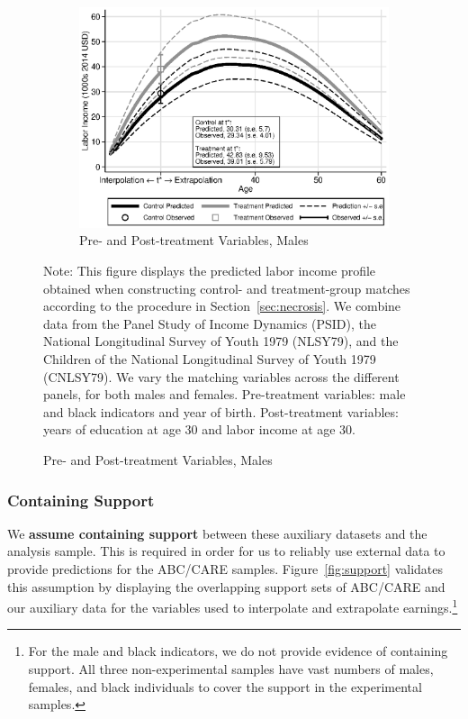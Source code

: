 \begin{figure}
\begin{subfigure}[h]{0.3\textwidth}
\end{subfigure}%
\begin{subfigure}[h]{0.3\textwidth}
	\centering
	\caption{Pre- and Post-treatment Variables, Males}
		\includegraphics[width=\textwidth]{output/labor_25-65_pset1_mset3_male.eps}
\end{subfigure}
\footnotesize \justify
Note: This figure displays the predicted labor income profile obtained when constructing control- and treatment-group matches according to the procedure in Section~\ref{sec:necrosis}. We combine data from the Panel Study of Income Dynamics (PSID), the National Longitudinal Survey of Youth 1979 (NLSY79), and the Children of the National Longitudinal Survey of Youth 1979 (CNLSY79). We vary the matching variables across the different panels, for both males and females. Pre-treatment variables: male and black indicators and year of birth. Post-treatment variables: years of education at age 30 and labor income at age 30.
\end{figure}

\subsubsection{Containing Support}

\noindent We \textbf{assume containing support} between these auxiliary datasets and the analysis sample. This is required in order for us to reliably use external data to provide predictions for the ABC/CARE samples. Figure~\ref{fig:support} validates this assumption by displaying the overlapping support sets of ABC/CARE and our auxiliary data for the variables used to interpolate and extrapolate earnings.\footnote{For the male and black indicators, we do not provide evidence of containing support. All three non-experimental samples have vast numbers of males, females, and black individuals to cover the support in the experimental samples.}\\

